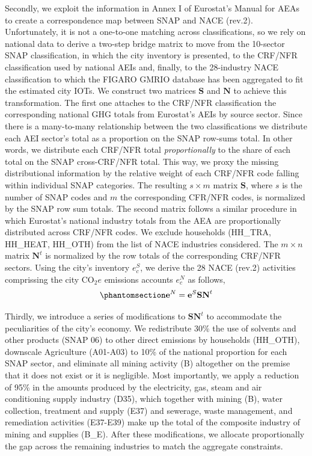 \documentclass[
  10pt,
  twocolumn]{aft}
\begin{document}
Secondly, we exploit the information in Annex I of Eurostat's Manual for
AEAs \citep{eurostat_manual_2015} to create a correspondence map between
SNAP and NACE (rev.2). Unfortunately, it is not a one-to-one matching
across classifications, so we rely on national data to derive a two-step
bridge matrix to move from the 10-sector SNAP classification, in which
the city inventory is presented, to the CRF/NFR classification used by
national AEIs and, finally, to the 28-industry NACE classification to
which the FIGARO GMRIO database has been aggregated to fit the estimated
city IOTs. We construct two matrices \(\textbf{S}\) and \(\textbf{N}\)
to achieve this transformation. The first one attaches to the CRF/NFR
classification the corresponding national GHG totals from Eurostat's
AEIs by source sector. Since there is a many-to-many relationship
between the two classifications we distribute each AEI sector's total as
a proportion on the SNAP row-sums total. In other words, we distribute
each CRF/NFR total \emph{proportionally} to the share of each total on
the SNAP cross-CRF/NFR total. This way, we proxy the missing
distributional information by the relative weight of each CRF/NFR code
falling within individual SNAP categories. The resulting \(s \times m\)
matrix \(\textbf{S}\), where \(s\) is the number of SNAP codes and \(m\)
the corresponding CFR/NFR codes, is normalized by the SNAP row sum
totals. The second matrix follows a similar procedure in which
Eurostat's national industry totals from the AEA are proportionally
distributed across CRF/NFR codes. We exclude households (HH\_TRA,
HH\_HEAT, HH\_OTH) from the list of NACE industries considered. The
\(m \times n\) matrix \(\textbf{N}^t\) is normalized by the row totals
of the corresponding CRF/NFR sectors. Using the city's inventory
\(e^{S}_{c}\), we derive the 28 NACE (rev.2) activities comprissing the
city \(\text{CO}_2e\) emissions accounts \(e^{N}_c\) as follows,
\vspace{-3pt}
\begin{equation}\phantomsection\label{eq-bridge-accounts}{ \textbf{e}^{N} = \textbf{e}^{S}\textbf{S}\textbf{N}^t }\end{equation}

Thirdly, we introduce a series of modifications to
\(\textbf{S}\textbf{N}^t\) to accommodate the peculiarities of the
city's economy. We redistribute 30\% the use of solvents and other
products (SNAP 06) to other direct emissions by households (HH\_OTH),
downscale Agriculture (A01-A03) to 10\% of the national proportion for
each SNAP sector, and eliminate all mining activity (B) altogether on
the premise that it does not exist or it is negligible. Most
importantly, we apply a reduction of 95\% in the amounts produced by the
electricity, gas, steam and air conditioning supply industry (D35),
which together with mining (B), water collection, treatment and supply
(E37) and sewerage, waste management, and remediation activities
(E37-E39) make up the total of the composite industry of mining and
supplies (B\_E). After these modifications, we allocate proportionally
the gap across the remaining industries to match the aggregate
constraints.
\end{document}
